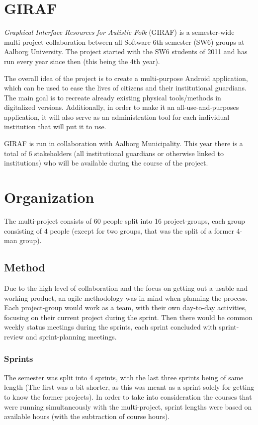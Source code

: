 \section{GIRAF}

\textit{Graphical Interface Resources for Autistic Folk} (GIRAF) is a semester-wide multi-project collaboration between all Software 6th semester (SW6) groups at Aalborg University.
The project started with the SW6 students of 2011 and has run every year since then (this being the 4th year).

The overall idea of the project is to create a multi-purpose Android application, which can be used to ease the lives of citizens and their institutional guardians.
The main goal is to recreate already existing physical tools/methods in digitalized versions.
Additionally, in order to make it an all-use-and-purposes application, it will also serve as an administration tool for each individual institution that will put it to use.

GIRAF is run in collaboration with Aalborg Municipality.
This year there is a total of 6 stakeholders (all institutional guardians or otherwise linked to institutions) who will be available during the course of the project.

\section{Organization}
The multi-project consists of 60 people split into 16 project-groups, each group consisting of 4 people (except for two groups, that was the split of a former 4-man group).

\subsection{Method}
Due to the high level of collaboration and the focus on getting out a usable and working product, an agile methodology was in mind when planning the process.
Each project-group would work as a team, with their own day-to-day activities, focusing on their current project during the sprint.
Then there would be common weekly status meetings during the sprints, each sprint concluded with sprint-review and sprint-planning meetings.

\subsubsection{Sprints}
The semester was split into 4 sprints, with the last three sprints being of same length (The first was a bit shorter, as this was meant as a sprint solely for getting to know the former projects).
In order to take into consideration the courses that were running simultaneously with the multi-project, sprint lengths were based on available hours (with the subtraction of course hours).

